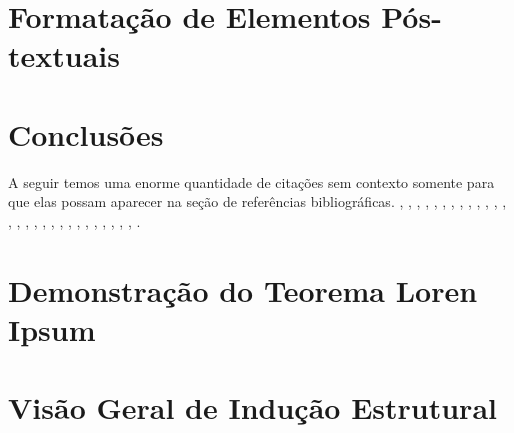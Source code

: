 \documentclass[times,english,brazil,oneside]{ifes7}
\begin{document}
\chapter{Formatação de Elementos Pós-textuais}
\label{cha:format-pos-text}



\chapter{Conclusões}

A seguir temos uma enorme quantidade de citações sem contexto somente
para que elas possam aparecer na seção de referências bibliográficas.
\cite{abntex2classe}, \cite{abntex2-wiki-como-customizar},
\cite{abntex2modelo-artigo}, \cite{abntex2modelo-relatorio},
\cite{abntex2modelo}, \cite{abntex2cite}, \cite{abntex2cite-alf},
\cite{Ifes2014}, \cite{NBR6024:2012}, \cite{araujo2012},
\cite{talbot2012}, \cite{NBR14724:2011}, \cite{EIA649B},
\cite{bates2010}, \cite{memoir}, \cite{masolo2010}, \cite{babel},
\cite{NBR14724:2005}, \cite{macedo2005}, \cite{guizzardi2005},
\cite{NBR6028:2003}, \cite{NBR10520:2002}, \cite{NBR14724:2002},
\cite{NBR14724:2001}, \cite{guarino1995}, \cite{ibge1993},
\cite{van86}, \cite{dewey1980}, \cite{doxiadis1965}.

\postextual




\apendices

\partapendices*

\chapter{Demonstração do Teorema Loren Ipsum}

\blindtext[7]


\chapter{Visão Geral de Indução Estrutural}
\end{document}
